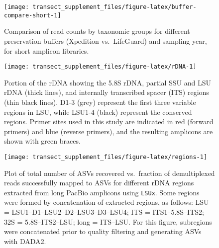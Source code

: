 \documentclass[
]{article}
\begin{document}
\begin{figure}

{\centering \texttt{[image: transect\_supplement\_files/figure-latex/buffer-compare-short-1]} 

}

\caption{Comparison of read counts by taxonomic groups for different preservation buffers (Xpedition vs.~LifeGuard) and sampling year, for short amplicon libraries.}\label{fig:buffer-compare-short}
\end{figure}





\begin{figure}

{\centering \texttt{[image: transect\_supplement\_files/figure-latex/rDNA-1]} 

}

\caption[Portion of the rDNA showing the 5.8S rDNA, partial SSU and LSU rDNA, and internally transcribed spacer (ITS) regions]{Portion of the rDNA showing the 5.8S rDNA, partial SSU and LSU rDNA (thick lines), and internally transcribed spacer (ITS) regions (thin black lines). D1-3 (grey) represent the first three variable regions in LSU, while LSU1-4 (black) represent the conserved regions. Primer sites used in this study are indicated in red (forward primers) and blue (reverse primers), and the resulting amplicons are shown with green braces.}\label{fig:rDNA}
\end{figure}










\begin{figure}

{\centering \texttt{[image: transect\_supplement\_files/figure-latex/regions-1]} 

}

\caption[Plot of total number of ASVs recovered vs.~fraction of demultiplexed reads successfully mapped to ASVs for different rDNA regions extracted from long PacBio amplicons using \texttt{LSUx}]{Plot of total number of ASVs recovered vs.~fraction of demultiplexed reads successfully mapped to ASVs for different rDNA regions extracted from long PacBio amplicons using \texttt{LSUx}. Some regions were formed by concatenation of extracted regions, as follows:
LSU = LSU1--D1--LSU2--D2--LSU3--D3--LSU4;
ITS = ITS1--5.8S--ITS2;
32S = 5.8S--ITS2--LSU;
long = ITS--LSU.
For this figure, subregions were concatenated prior to quality filtering and generating ASVs with DADA2.}\label{fig:regions}
\end{figure}
\end{document}
